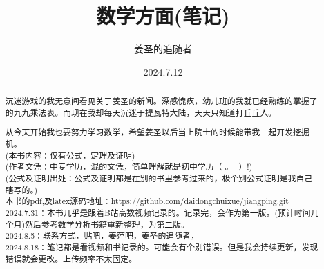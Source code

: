 
\title{数学方面(笔记)} %
\author{姜圣的追随者}  %
\date{2024.7.12} %

\maketitle %
\newpage
\begin{abstract}
    沉迷游戏的我无意间看见关于姜圣的新闻。深感愧疚，幼儿班的我就已经熟练的掌握了的九九乘法表。而现在我却每天沉迷于提瓦特大陆，天天只知道打丘丘人。\par 从今天开始我也要努力学习数学，希望姜圣以后当上院士的时候能带我一起开发挖掘机。
    \\(本书内容：仅有公式，定理及证明)
    \\(作者文凭：中专学历，混的文凭，简单理解就是初中学历（-。- ）!)
    \\(公式及证明出处：公式及证明都是在别的书里参考过来的，极个别公式证明是我自己瞎写的。)
    \\本书的pdf,及latex源码地址：https://github.com/daidongchuixue/jiangping.git
    \\2024.7.31：本书几乎是跟着B站高数视频记录的。记录完，会作为第一版。(预计时间几个月)然后参考数学分析书籍重新整理，为第二版。
    \\2024.8.5：联系方式，贴吧，姜萍吧，姜圣的追随者，
    \\2024.8.18：笔记都是看视频和书记录的。可能会有个别错误。但是我会持续更新，发现错误就会更改。上传频率不太固定。

\end{abstract}
\newpage
\renewcommand{\contentsname}{\begin{center}目录\end{center} }
\tableofcontents %


\pagestyle{fancy} %

